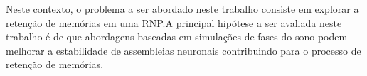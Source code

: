 Neste contexto, o problema a ser abordado neste trabalho consiste em explorar a retenção de memórias em uma RNP.\@ A principal
hipótese a ser avaliada neste trabalho é de que abordagens baseadas em simulações de fases do sono podem melhorar a estabilidade
de assembleias neuronais contribuindo para o processo de retenção de memórias.





